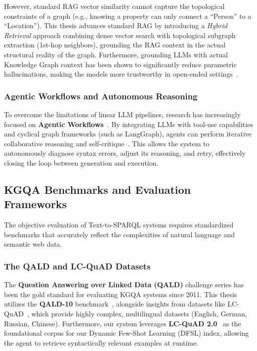 However, standard RAG vector similarity cannot capture the topological constraints of a graph (e.g., knowing a property can only connect a ``Person'' to a ``Location''). This thesis advances standard RAG by introducing a \textit{Hybrid Retrieval} approach combining dense vector search with topological subgraph extraction (1st-hop neighbors), grounding the RAG context in the actual structural reality of the graph. Furthermore, grounding LLMs with actual Knowledge Graph context has been shown to significantly reduce parametric hallucinations, making the models more trustworthy in open-ended settings~\cite{sui_can_2025}.

\subsubsection{Agentic Workflows and Autonomous Reasoning}
To overcome the limitations of linear LLM pipelines, research has increasingly focused on \textbf{Agentic Workflows}~\cite{weng2023agents}. By integrating LLMs with tool-use capabilities and cyclical graph frameworks (such as LangGraph), agents can perform iterative collaborative reasoning and self-critique~\cite{zhao_agentict2srobust_2025, perevalov_text--sparql_2025}. This allows the system to autonomously diagnose syntax errors, adjust its reasoning, and retry, effectively closing the loop between generation and execution.

\subsection{KGQA Benchmarks and Evaluation Frameworks}
The objective evaluation of Text-to-SPARQL systems requires standardized benchmarks that accurately reflect the complexities of natural language and semantic web data.

\subsubsection{The QALD and LC-QuAD Datasets}
The \textbf{Question Answering over Linked Data (QALD)} challenge series has been the gold standard for evaluating KGQA systems since 2011. This thesis utilizes the \textbf{QALD-10} benchmark~\cite{usbeck2019benchmarking}, alongside insights from datasets like LC-QuAD~\cite{steinmetz_what_2021}, which provide highly complex, multilingual datasets (English, German, Russian, Chinese). Furthermore, our system leverages \textbf{LC-QuAD 2.0}~\cite{dubey2019lcquad} as the foundational corpus for our Dynamic Few-Shot Learning (DFSL) index, allowing the agent to retrieve syntactically relevant examples at runtime.

